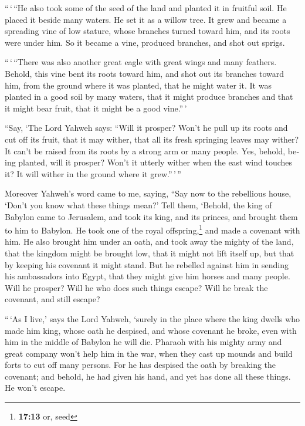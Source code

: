 \begin{paracol}{2}
\begin{otherlanguage}{english}
 ``\,`\,``He also took some of the seed of the land and
planted it in fruitful soil. He placed it beside many waters. He set it
as a willow tree.  It grew and became a spreading vine of
low stature, whose branches turned toward him, and its roots were under
him. So it became a vine, produced branches, and shot out sprigs.

 ``\,`\,``There was also another great eagle with great
wings and many feathers. Behold, this vine bent its roots toward him,
and shot out its branches toward him, from the ground where it was
planted, that he might water it.  It was planted in a good
soil by many waters, that it might produce branches and that it might
bear fruit, that it might be a good vine.''\,'

 ``Say, `The Lord Yahweh says: ``Will it prosper? Won't he
pull up its roots and cut off its fruit, that it may wither, that all
its fresh springing leaves may wither? It can't be raised from its roots
by a strong arm or many people.  Yes, behold, being
planted, will it prosper? Won't it utterly wither when the east wind
touches it? It will wither in the ground where it grew.''\,'\,''

 Moreover Yahweh's word came to me, saying,
 ``Say now to the rebellious house, `Don't you know what
these things mean?' Tell them, `Behold, the king of Babylon came to
Jerusalem, and took its king, and its princes, and brought them to him
to Babylon.  He took one of the royal
offspring,\footnote{\textbf{17:13} or, seed} and made a covenant with
him. He also brought him under an oath, and took away the mighty of the
land,  that the kingdom might be brought low, that it
might not lift itself up, but that by keeping his covenant it might
stand.  But he rebelled against him in sending his
ambassadors into Egypt, that they might give him horses and many people.
Will he prosper? Will he who does such things escape? Will he break the
covenant, and still escape?

 ``\,`As I live,' says the Lord Yahweh, `surely in the
place where the king dwells who made him king, whose oath he despised,
and whose covenant he broke, even with him in the middle of Babylon he
will die.  Pharaoh with his mighty army and great company
won't help him in the war, when they cast up mounds and build forts to
cut off many persons.  For he has despised the oath by
breaking the covenant; and behold, he had given his hand, and yet has
done all these things. He won't escape.


\end{otherlanguage}
\end{paracol}
